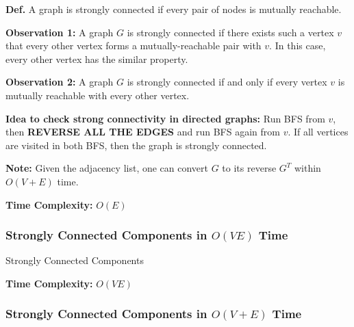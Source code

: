 \documentclass[10pt]{article}
\begin{document}
\textbf{Def.} A graph is strongly connected if every pair of nodes is mutually reachable.

\textbf{Observation 1:} A graph $G$ is strongly connected if there exists such a vertex $v$ that every other vertex forms a mutually-reachable pair with $v$. In this case, every other vertex has the similar property.

\textbf{Observation 2:} A graph $G$ is strongly connected if and only if every vertex $v$ is mutually reachable with every other vertex.

\textbf{Idea to check strong connectivity in directed graphs:} Run BFS from $v$, then \textbf{REVERSE ALL THE EDGES} and run BFS again from $v$. If all vertices are visited in both BFS, then the graph is strongly connected.

\textbf{Note:} Given the adjacency list, one can convert $G$ to its reverse $G^T$ within $O(V+E)$ time.

\textbf{Time Complexity:} $O(E)$

\subsubsection{Strongly Connected Components in $O(VE)$ Time}

\begin{algorithm}
	\SetAlgoLined
	
	\caption{Strongly Connected Components}
\end{algorithm}

\textbf{Time Complexity:} $O(VE)$

\subsubsection{Strongly Connected Components in $O(V+E)$ Time}
\end{document}
